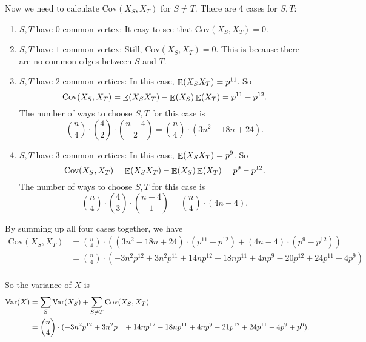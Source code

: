 \documentclass{homework}
\begin{document}
\begin{solution}
  Now we need to calculate $\text{Cov}(X_S, X_T)$ for $S \neq T$.
  There are 4 cases for $S, T$:
  
  \begin{enumerate}
    \item $S, T$ have $0$ common vertex: It easy to see that $\text{Cov}(X_S, X_T) = 0$.
    \item $S, T$ have $1$ common vertex: Still, $\text{Cov}(X_S, X_T) = 0$.
          This is because there are no common edges between $S$ and $T$.
    \item $S, T$ have $2$ common vertices: In this case, $\mathop{\mathbb{E}}\displaylimits(X_SX_T) = p^{11}$.
          So
          \begin{equation*}
            \text{Cov}(X_S, X_T) = \mathop{\mathbb{E}}\displaylimits(X_SX_T) - \mathop{\mathbb{E}}\displaylimits(X_S)\mathop{\mathbb{E}}\displaylimits(X_T) = p^{11} - p^{12}.
          \end{equation*}
          The number of ways to choose $S, T$ for this case is
          \begin{equation*}
            \binom{n}{4} \cdot \binom{4}{2} \cdot \binom{n-4}{2} = \binom{n}{4} \cdot (3n^2 - 18n + 24).
          \end{equation*}
    \item $S, T$ have $3$ common vertices: In this case, $\mathop{\mathbb{E}}\displaylimits(X_SX_T) = p^{9}$.
          So
          \begin{equation*}
            \text{Cov}(X_S, X_T) = \mathop{\mathbb{E}}\displaylimits(X_SX_T) - \mathop{\mathbb{E}}\displaylimits(X_S)\mathop{\mathbb{E}}\displaylimits(X_T) = p^{9} - p^{12}.
          \end{equation*}
          The number of ways to choose $S, T$ for this case is
          \begin{equation*}
            \binom{n}{4} \cdot \binom{4}{3} \cdot \binom{n-4}{1} = \binom{n}{4} \cdot (4n - 4).
          \end{equation*}
  \end{enumerate}

  By summing up all four cases together, we have
  \begin{align*}
    \text{Cov}(X_S, X_T) & = \binom{n}{4} \cdot 
    ((3n^2 - 18n + 24) \cdot (p^{11} - p^{12}) 
    + (4n - 4) \cdot (p^{9} - p^{12})) \\
    & = \binom{n}{4} \cdot (-3 n^2 p^{12} + 3 n^2 p^{11} + 14 n p^{12} - 18 n p^{11} + 4 n p^9 - 20 p^{12} + 24 p^{11} - 4 p^9) \\
  \end{align*}

  So the variance of $X$ is
  \begin{align*}
    \mathop{\mathrm{Var}}\displaylimits(X) & = \sum_{S}\mathop{\mathrm{Var}}\displaylimits(X_S) + \sum_{S \neq T}\text{Cov}(X_S, X_T) \\
    & = \binom{n}{4} \cdot (-3 n^2 p^{12} + 3 n^2 p^{11} + 14 n p^{12} - 18 n p^{11} + 4 n p^9 - 21 p^{12} + 24 p^{11} - 4 p^9 + p^6).
  \end{align*}


\end{solution}
\end{document}
